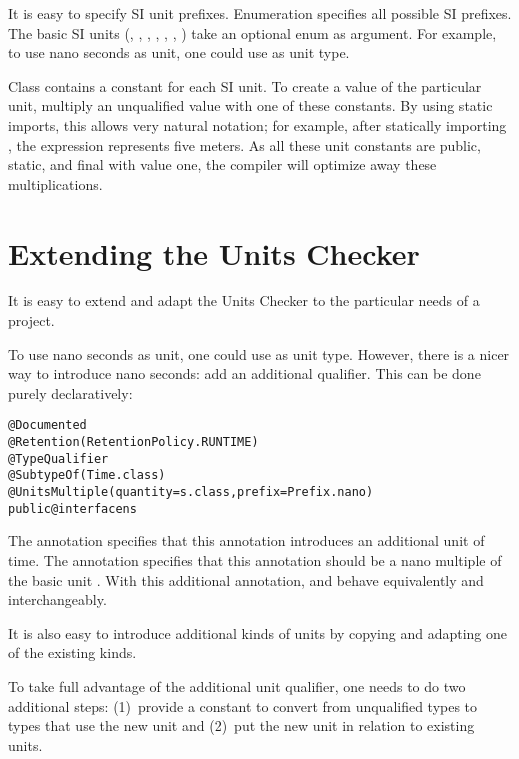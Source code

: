 It is easy to specify SI unit prefixes.
Enumeration  specifies all possible SI prefixes.
The basic SI units
(, , , , ,
 , )
take an optional  enum as argument.
For example, to use nano seconds as unit, one could use
 as unit type.

Class  contains a constant for each SI unit.
To create a value of the particular unit, multiply an unqualified
value with one of these constants.
By using static imports, this allows very natural notation; for
example, after statically importing ,
the expression  represents five meters.
As all these unit constants are public, static, and final with value
one, the compiler will optimize away these multiplications.


\section{Extending the Units Checker}

It is easy to extend and adapt the Units Checker to the particular
needs of a project.


To use nano seconds as unit, one could use
 as unit type.
However, there is a nicer way to introduce nano seconds: add an
additional qualifier.
This can be done purely declaratively:

\begin{alltt}
@Documented
@Retention(RetentionPolicy.RUNTIME)
@TypeQualifier
@SubtypeOf( \ttlcb{} Time.class \ttrcb{} )
@UnitsMultiple(quantity=s.class, prefix=Prefix.nano)
public @interface ns \ttlcb{}\ttrcb{}
\end{alltt}

The  annotation specifies that this annotation
introduces an additional unit of time.
The  annotation specifies that this annotation
should be a nano multiple of the basic unit .
With this additional annotation,  and
behave equivalently and interchangeably.


It is also easy to introduce additional kinds of units by copying and
adapting one of the existing kinds.

To take full advantage of the additional unit qualifier, one needs to
do two additional steps:
(1)~provide a constant to convert from unqualified types to types that use
the new unit and
(2)~put the new unit in relation to existing units.

